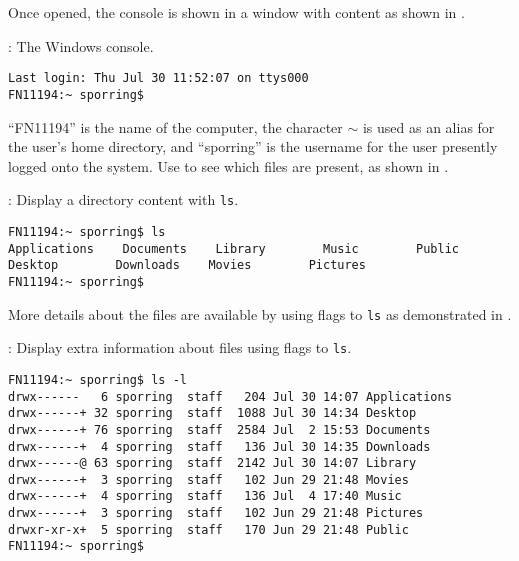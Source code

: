 Once opened, the console is shown in a window with content as shown in .
\begin{codeNOutput}[label=LinuxConsole]{: The Windows console.}
  \begin{lstlisting}[language=console,escapechar=§]
Last login: Thu Jul 30 11:52:07 on ttys000
FN11194:~ sporring$ 
\end{lstlisting}%
\end{codeNOutput}
``FN11194'' is the name of the computer, the character $\sim$ is used as an alias for the user's home directory, and ``sporring'' is the username for the user presently logged onto the system. Use  to see which files are present, as shown in .
\begin{codeNOutput}[label=LinuxLs]{: Display a directory content with \lstinline[language=console]{ls}.}
  \begin{lstlisting}[language=console,escapechar=§]
FN11194:~ sporring$ ls
Applications    Documents    Library        Music        Public
Desktop        Downloads    Movies        Pictures
FN11194:~ sporring$ 
\end{lstlisting}
\end{codeNOutput}
More details about the files are available by using flags to \lstinline[language=console]{ls} as demonstrated in .
\begin{codeNOutput}[label=LinuxLsFlags]{: Display extra information about files using flags to \lstinline[language=console]{ls}.}
  \begin{lstlisting}[language=console,escapechar=§]
FN11194:~ sporring$ ls -l
drwx------   6 sporring  staff   204 Jul 30 14:07 Applications
drwx------+ 32 sporring  staff  1088 Jul 30 14:34 Desktop
drwx------+ 76 sporring  staff  2584 Jul  2 15:53 Documents
drwx------+  4 sporring  staff   136 Jul 30 14:35 Downloads
drwx------@ 63 sporring  staff  2142 Jul 30 14:07 Library
drwx------+  3 sporring  staff   102 Jun 29 21:48 Movies
drwx------+  4 sporring  staff   136 Jul  4 17:40 Music
drwx------+  3 sporring  staff   102 Jun 29 21:48 Pictures
drwxr-xr-x+  5 sporring  staff   170 Jun 29 21:48 Public
FN11194:~ sporring$ 
\end{lstlisting}
\end{codeNOutput}
